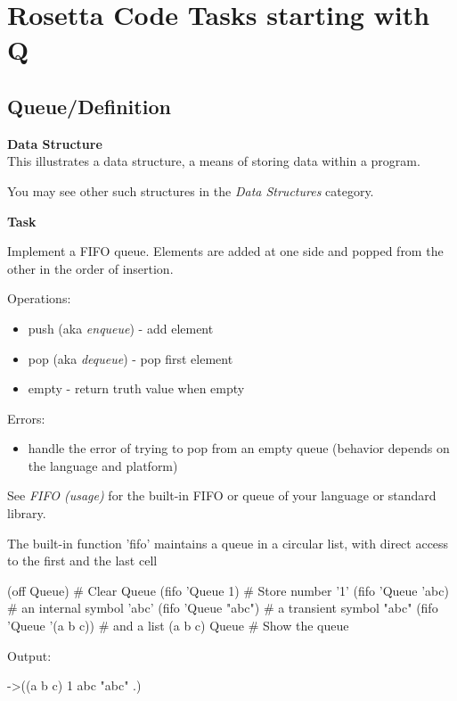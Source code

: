 %
%
%

\chapter{Rosetta Code Tasks starting with Q}

\section*{Queue/Definition}

\textbf{Data Structure}\\ This illustrates a data structure, a means of
storing data within a program.

You may see other such structures in the
\emph{Data Structures} category.


\textbf{Task}

Implement a FIFO queue. Elements are added at one side and popped from
the other in the order of insertion.

Operations:

\begin{itemize}
\item
  push (aka \emph{enqueue}) - add element
\item
  pop (aka \emph{dequeue}) - pop first element
\item
  empty - return truth value when empty
\end{itemize}

Errors:

\begin{itemize}
\item
  handle the error of trying to pop from an empty queue (behavior
  depends on the language and platform)
\end{itemize}

See \emph{FIFO (usage)} for the built-in FIFO or
queue of your language or standard library.


\begin{wideverbatim}

The built-in function 'fifo' maintains a queue in a circular list, with direct
access to the first and the last cell

(off Queue)                # Clear Queue
(fifo 'Queue 1)            # Store number '1'
(fifo 'Queue 'abc)         # an internal symbol 'abc'
(fifo 'Queue "abc")        # a transient symbol "abc"
(fifo 'Queue '(a b c))     # and a list (a b c)
Queue                      # Show the queue

Output:

->((a b c) 1 abc "abc" .)

\end{wideverbatim}

